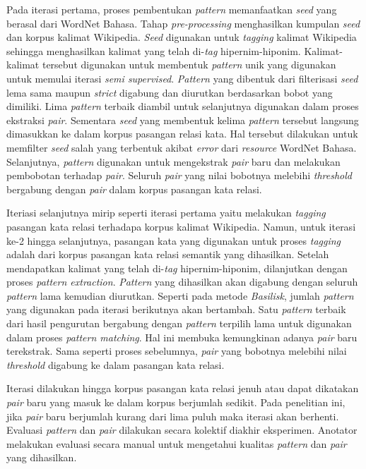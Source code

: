 Pada iterasi pertama, proses pembentukan \textit{pattern} memanfaatkan \textit{seed} yang berasal dari WordNet Bahasa. Tahap \textit{pre-processing} menghasilkan kumpulan \textit{seed} dan korpus kalimat Wikipedia. \textit{Seed} digunakan untuk \textit{tagging} kalimat Wikipedia sehingga menghasilkan kalimat yang telah di-\textit{tag} hipernim-hiponim. Kalimat-kalimat tersebut digunakan untuk membentuk \textit{pattern} unik yang digunakan untuk memulai iterasi \textit{semi supervised}. \textit{Pattern} yang dibentuk dari filterisasi \textit{seed} lema sama maupun \textit{strict} digabung dan diurutkan berdasarkan bobot yang dimiliki. Lima \textit{pattern} terbaik diambil untuk selanjutnya digunakan dalam proses ekstraksi \textit{pair}. Sementara \textit{seed} yang membentuk kelima \textit{pattern} tersebut langsung dimasukkan ke dalam korpus pasangan relasi kata. Hal tersebut dilakukan untuk memfilter \textit{seed} salah yang terbentuk akibat \textit{error} dari \textit{resource} WordNet Bahasa. Selanjutnya, \textit{pattern} digunakan untuk mengekstrak \textit{pair} baru dan melakukan pembobotan terhadap \textit{pair}. Seluruh \textit{pair} yang nilai bobotnya melebihi \textit{threshold} bergabung dengan \textit{pair} dalam korpus pasangan kata relasi.

Iteriasi selanjutnya mirip seperti iterasi pertama yaitu melakukan \textit{tagging} pasangan kata relasi terhadapa korpus kalimat Wikipedia. Namun, untuk iterasi ke-2 hingga selanjutnya, pasangan kata yang digunakan untuk proses \textit{tagging} adalah dari korpus pasangan kata relasi semantik yang dihasilkan. Setelah mendapatkan kalimat yang telah di-\textit{tag} hipernim-hiponim, dilanjutkan dengan proses \textit{pattern extraction}. \textit{Pattern} yang dihasilkan akan digabung dengan seluruh \textit{pattern} lama kemudian diurutkan. Seperti pada metode \textit{Basilisk}, jumlah \textit{pattern} yang digunakan pada iterasi berikutnya akan bertambah. Satu \textit{pattern} terbaik dari hasil pengurutan bergabung dengan \textit{pattern} terpilih lama untuk digunakan dalam proses \textit{pattern matching}. Hal ini membuka kemungkinan adanya \textit{pair} baru terekstrak. Sama seperti proses sebelumnya, \textit{pair} yang bobotnya melebihi nilai \textit{threshold} digabung ke dalam \noindent pasangan kata relasi.

Iterasi dilakukan hingga korpus pasangan kata relasi jenuh atau dapat dikatakan \textit{pair} baru yang masuk ke dalam korpus berjumlah sedikit. Pada penelitian ini, jika \textit{pair} baru berjumlah kurang dari lima puluh maka iterasi akan berhenti. Evaluasi \textit{pattern} dan \textit{pair} dilakukan secara kolektif diakhir eksperimen. Anotator melakukan evaluasi secara manual untuk mengetahui kualitas \textit{pattern} dan \textit{pair} yang dihasilkan.


